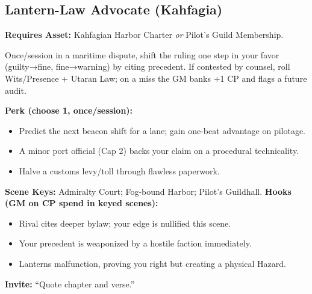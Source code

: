 \subsection{Lantern-Law Advocate (Kahfagia)}
\textbf{Requires Asset:} Kahfagian Harbor Charter \emph{or} Pilot's Guild Membership.
\begin{tcolorbox}[enhanced,sharp corners,boxrule=.6pt,title={Talent — Jurisdiction on the Tide (5 XP)}]
Once/session in a maritime dispute, shift the ruling one step in your favor (guilty→fine, fine→warning) by citing precedent. If contested by counsel, roll Wits/Presence + Utaran Law; on a miss the GM banks +1 CP and flags a future audit.
\end{tcolorbox}
\textbf{Perk (choose 1, once/session):}
\begin{itemize}
  \item Predict the next beacon shift for a lane; gain one-beat advantage on pilotage.
  \item A minor port official (Cap 2) backs your claim on a procedural technicality.
  \item Halve a customs levy/toll through flawless paperwork.
\end{itemize}
\textbf{Scene Keys:} Admiralty Court; Fog-bound Harbor; Pilot's Guildhall.
\textbf{Hooks (GM on CP spend in keyed scenes):}
\begin{itemize}
  \item Rival cites deeper bylaw; your edge is nullified this scene.
  \item Your precedent is weaponized by a hostile faction immediately.
  \item Lanterns malfunction, proving you right but creating a physical Hazard.
\end{itemize}
\textbf{Invite:} “Quote chapter and verse.”

